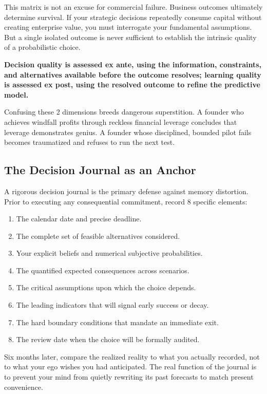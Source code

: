 This matrix is not an excuse for commercial failure. Business outcomes ultimately determine survival. If your strategic decisions repeatedly consume capital without creating enterprise value, you must interrogate your fundamental assumptions. But a single isolated outcome is never sufficient to establish the intrinsic quality of a probabilistic choice.

\textbf{Decision quality is assessed ex ante, using the information, constraints, and alternatives available before the outcome resolves; learning quality is assessed ex post, using the resolved outcome to refine the predictive model.}

Confusing these 2 dimensions breeds dangerous superstition. A founder who achieves windfall profits through reckless financial leverage concludes that leverage demonstrates genius. A founder whose disciplined, bounded pilot fails becomes traumatized and refuses to run the next test.

\subsection{The Decision Journal as an Anchor}

A rigorous decision journal is the primary defense against memory distortion. Prior to executing any consequential commitment, record 8 specific elements:
\begin{enumerate}[leftmargin=12pt,itemsep=2pt,topsep=1pt,parsep=0pt]
  \item The calendar date and precise deadline.
  \item The complete set of feasible alternatives considered.
  \item Your explicit beliefs and numerical subjective probabilities.
  \item The quantified expected consequences across scenarios.
  \item The critical assumptions upon which the choice depends.
  \item The leading indicators that will signal early success or decay.
  \item The hard boundary conditions that mandate an immediate exit.
  \item The review date when the choice will be formally audited.
\end{enumerate}

Six months later, compare the realized reality to what you actually recorded, not to what your ego wishes you had anticipated. The real function of the journal is to prevent your mind from quietly rewriting its past forecasts to match present convenience.

